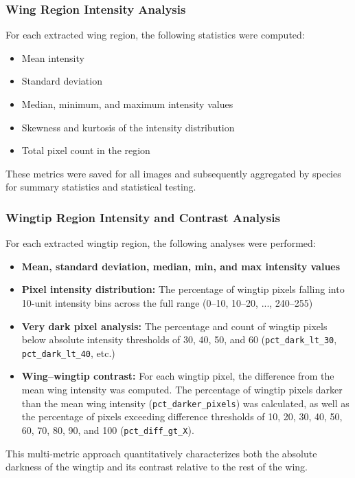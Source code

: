 \documentclass[a4paper,12pt]{article}
\begin{document}
\subsubsection{Wing Region Intensity Analysis}

For each extracted wing region, the following statistics were computed:
\begin{itemize}
    \item Mean intensity
    \item Standard deviation
    \item Median, minimum, and maximum intensity values
    \item Skewness and kurtosis of the intensity distribution
    \item Total pixel count in the region
\end{itemize}
These metrics were saved for all images and subsequently aggregated by species for summary statistics and statistical testing.

\subsubsection{Wingtip Region Intensity and Contrast Analysis}

For each extracted wingtip region, the following analyses were performed:
\begin{itemize}
    \item \textbf{Mean, standard deviation, median, min, and max intensity values}
    \item \textbf{Pixel intensity distribution:} The percentage of wingtip pixels falling into 10-unit intensity bins across the full range (0--10, 10--20, ..., 240--255)
    \item \textbf{Very dark pixel analysis:} The percentage and count of wingtip pixels below absolute intensity thresholds of 30, 40, 50, and 60 (\texttt{pct\_dark\_lt\_30}, \texttt{pct\_dark\_lt\_40}, etc.)
    \item \textbf{Wing--wingtip contrast:} For each wingtip pixel, the difference from the mean wing intensity was computed. The percentage of wingtip pixels darker than the mean wing intensity (\texttt{pct\_darker\_pixels}) was calculated, as well as the percentage of pixels exceeding difference thresholds of 10, 20, 30, 40, 50, 60, 70, 80, 90, and 100 (\texttt{pct\_diff\_gt\_X}).
\end{itemize}
This multi-metric approach quantitatively characterizes both the absolute darkness of the wingtip and its contrast relative to the rest of the wing.
\end{document}
